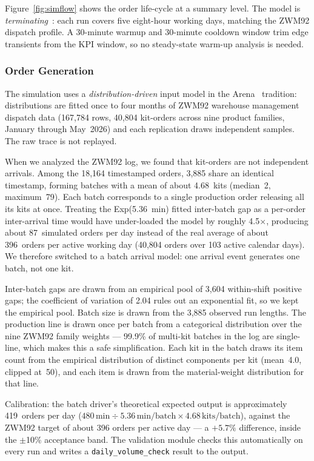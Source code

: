 Figure~\ref{fig:simflow} shows the order life-cycle at a summary level.
The model is \emph{terminating}~\cite{law2015}: each run covers five
eight-hour working days, matching the ZWM92 dispatch profile. A 30-minute
warmup and 30-minute cooldown window trim edge transients from the KPI
window, so no steady-state warm-up analysis is needed.

\subsubsection{Order Generation}

The simulation uses a \emph{distribution-driven} input model in the
Arena~\cite{law2015} tradition: distributions are fitted once to four
months of ZWM92 warehouse management dispatch data (167,784 rows, 40,804
kit-orders across nine product families, January through May~2026) and each
replication draws independent samples. The raw trace is not replayed.

When we analyzed the ZWM92 log, we found that kit-orders are not independent
arrivals. Among the 18,164 timestamped orders, 3,885 share an identical
timestamp, forming batches with a mean of about 4.68~kits (median~2,
maximum~79). Each batch corresponds to a single production order releasing
all its kits at once. Treating the Exp(5.36~min) fitted inter-batch gap as
a per-order inter-arrival time would have under-loaded the model by roughly
4.5$\times$, producing about 87~simulated orders per day instead of the
real average of about 396~orders per active working day (40,804 orders over
103 active calendar days). We therefore switched to a batch arrival model:
one arrival event generates one batch, not one kit.

Inter-batch gaps are drawn from an empirical pool of 3,604 within-shift
positive gaps; the coefficient of variation of 2.04 rules out an exponential
fit, so we kept the empirical pool. Batch size is drawn from the 3,885
observed run lengths. The production line is drawn once per batch from a
categorical distribution over the nine ZWM92 family weights --- 99.9\% of
multi-kit batches in the log are single-line, which makes this a safe
simplification. Each kit in the batch draws its item count from the empirical
distribution of distinct components per kit (mean~4.0, clipped at~50), and
each item is drawn from the material-weight distribution for that line.

Calibration: the batch driver's theoretical expected output is approximately
419~orders per day ($480\,\text{min} \div 5.36\,\text{min/batch} \times 4.68\,\text{kits/batch}$),
against the ZWM92 target of about 396 orders per active day --- a $+5.7\%$
difference, inside the $\pm$10\% acceptance band. The validation module
checks this automatically on every run and writes a
\texttt{daily\_volume\_check} result to the output.

